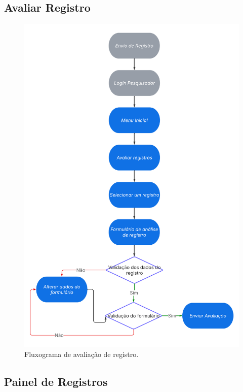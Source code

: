 \subsection{Avaliar Registro}

\begin{figure}[H]
    \centering
    \includegraphics[height=0.90\textheight]{diagrams/fluxograma_avaliar_registro.pdf}
    \caption{Fluxograma de avaliação de registro.}
    \label{fig:fluxo-avaliar-registro}
\end{figure}

\subsection{Painel de Registros}

